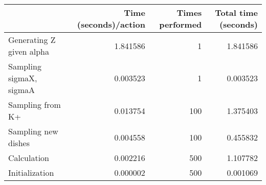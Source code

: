 \begin{tabular}{lrrr}
\toprule
{} &  Time (seconds)/action &  Times performed &  Total time (seconds) \\
\midrule
Generating Z given alpha &               1.841586 &                1 &              1.841586 \\
Sampling sigmaX, sigmaA  &               0.003523 &                1 &              0.003523 \\
Sampling from K+         &               0.013754 &              100 &              1.375403 \\
Sampling new dishes      &               0.004558 &              100 &              0.455832 \\
Calculation              &               0.002216 &              500 &              1.107782 \\
Initialization           &               0.000002 &              500 &              0.001069 \\
\bottomrule
\end{tabular}
